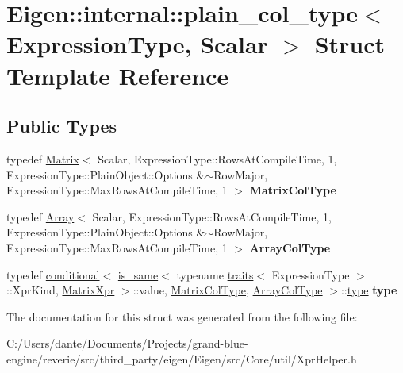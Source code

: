 \hypertarget{struct_eigen_1_1internal_1_1plain__col__type}{}\section{Eigen\+::internal\+::plain\+\_\+col\+\_\+type$<$ Expression\+Type, Scalar $>$ Struct Template Reference}
\label{struct_eigen_1_1internal_1_1plain__col__type}
\subsection*{Public Types}
\begin{DoxyCompactItemize}
\item 
\mbox{\label{struct_eigen_1_1internal_1_1plain__col__type_ac75ab0cd71ee5bed5adbd9b77eeba12a}} 
typedef \mbox{\hyperlink{class_eigen_1_1_matrix}{Matrix}}$<$ Scalar, Expression\+Type\+::\+Rows\+At\+Compile\+Time, 1, Expression\+Type\+::\+Plain\+Object\+::\+Options \&$\sim$Row\+Major, Expression\+Type\+::\+Max\+Rows\+At\+Compile\+Time, 1 $>$ {\bfseries Matrix\+Col\+Type}
\item 
\mbox{\label{struct_eigen_1_1internal_1_1plain__col__type_a17712acb2f07a712205370a99a62f402}} 
typedef \mbox{\hyperlink{class_eigen_1_1_array}{Array}}$<$ Scalar, Expression\+Type\+::\+Rows\+At\+Compile\+Time, 1, Expression\+Type\+::\+Plain\+Object\+::\+Options \&$\sim$Row\+Major, Expression\+Type\+::\+Max\+Rows\+At\+Compile\+Time, 1 $>$ {\bfseries Array\+Col\+Type}
\item 
\mbox{\label{struct_eigen_1_1internal_1_1plain__col__type_a0084ea2ac7f2803ac1c1c13e968e6b04}} 
typedef \mbox{\hyperlink{struct_eigen_1_1internal_1_1conditional}{conditional}}$<$ \mbox{\hyperlink{struct_eigen_1_1internal_1_1is__same}{is\+\_\+same}}$<$ typename \mbox{\hyperlink{struct_eigen_1_1internal_1_1traits}{traits}}$<$ Expression\+Type $>$\+::Xpr\+Kind, \mbox{\hyperlink{struct_eigen_1_1_matrix_xpr}{Matrix\+Xpr}} $>$\+::value, \mbox{\hyperlink{class_eigen_1_1_matrix}{Matrix\+Col\+Type}}, \mbox{\hyperlink{class_eigen_1_1_array}{Array\+Col\+Type}} $>$\+::\mbox{\hyperlink{struct_eigen_1_1internal_1_1true__type}{type}} {\bfseries type}
\end{DoxyCompactItemize}


The documentation for this struct was generated from the following file\+:\begin{DoxyCompactItemize}
\item 
C\+:/\+Users/dante/\+Documents/\+Projects/grand-\/blue-\/engine/reverie/src/third\+\_\+party/eigen/\+Eigen/src/\+Core/util/Xpr\+Helper.\+h\end{DoxyCompactItemize}

